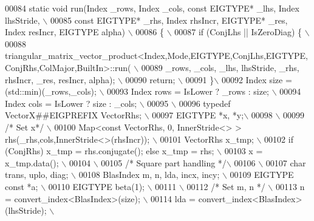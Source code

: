 \begin{DoxyCode}
00084 \textcolor{preprocessor}{ static void run(Index \_rows, Index \_cols, const EIGTYPE* \_lhs, Index lhsStride, \(\backslash\)}
00085 \textcolor{preprocessor}{                 const EIGTYPE* \_rhs, Index rhsIncr, EIGTYPE* \_res, Index resIncr, EIGTYPE alpha) \(\backslash\)}
00086 \textcolor{preprocessor}{ \{ \(\backslash\)}
00087 \textcolor{preprocessor}{   if (ConjLhs || IsZeroDiag) \{ \(\backslash\)}
00088 \textcolor{preprocessor}{     triangular\_matrix\_vector\_product<Index,Mode,EIGTYPE,ConjLhs,EIGTYPE,ConjRhs,ColMajor,BuiltIn>::run( \(\backslash\)}
00089 \textcolor{preprocessor}{       \_rows, \_cols, \_lhs, lhsStride, \_rhs, rhsIncr, \_res, resIncr, alpha); \(\backslash\)}
00090 \textcolor{preprocessor}{     return; \(\backslash\)}
00091 \textcolor{preprocessor}{   \}\(\backslash\)}
00092 \textcolor{preprocessor}{   Index size = (std::min)(\_rows,\_cols); \(\backslash\)}
00093 \textcolor{preprocessor}{   Index rows = IsLower ? \_rows : size; \(\backslash\)}
00094 \textcolor{preprocessor}{   Index cols = IsLower ? size : \_cols; \(\backslash\)}
00095 \textcolor{preprocessor}{\(\backslash\)}
00096 \textcolor{preprocessor}{   typedef VectorX##EIGPREFIX VectorRhs; \(\backslash\)}
00097 \textcolor{preprocessor}{   EIGTYPE *x, *y;\(\backslash\)}
00098 \textcolor{preprocessor}{\(\backslash\)}
00099 \textcolor{preprocessor}{}\textcolor{comment}{/* Set x*/}\textcolor{preprocessor}{ \(\backslash\)}
00100 \textcolor{preprocessor}{   Map<const VectorRhs, 0, InnerStride<> > rhs(\_rhs,cols,InnerStride<>(rhsIncr)); \(\backslash\)}
00101 \textcolor{preprocessor}{   VectorRhs x\_tmp; \(\backslash\)}
00102 \textcolor{preprocessor}{   if (ConjRhs) x\_tmp = rhs.conjugate(); else x\_tmp = rhs; \(\backslash\)}
00103 \textcolor{preprocessor}{   x = x\_tmp.data(); \(\backslash\)}
00104 \textcolor{preprocessor}{\(\backslash\)}
00105 \textcolor{preprocessor}{}\textcolor{comment}{/* Square part handling */}\textcolor{preprocessor}{\(\backslash\)}
00106 \textcolor{preprocessor}{\(\backslash\)}
00107 \textcolor{preprocessor}{   char trans, uplo, diag; \(\backslash\)}
00108 \textcolor{preprocessor}{   BlasIndex m, n, lda, incx, incy; \(\backslash\)}
00109 \textcolor{preprocessor}{   EIGTYPE const *a; \(\backslash\)}
00110 \textcolor{preprocessor}{   EIGTYPE beta(1); \(\backslash\)}
00111 \textcolor{preprocessor}{\(\backslash\)}
00112 \textcolor{preprocessor}{}\textcolor{comment}{/* Set m, n */}\textcolor{preprocessor}{ \(\backslash\)}
00113 \textcolor{preprocessor}{   n = convert\_index<BlasIndex>(size); \(\backslash\)}
00114 \textcolor{preprocessor}{   lda = convert\_index<BlasIndex>(lhsStride); \(\backslash\)}

\end{DoxyCode}
